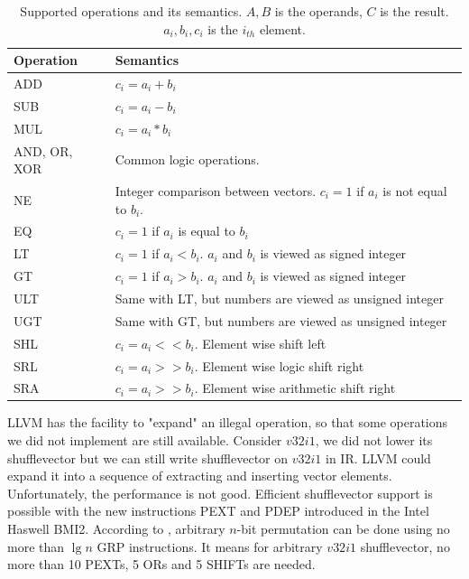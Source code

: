 \begin{table}
  \begin{center}
    \begin{tabular}{|l|l|}
      \hline
      Operation & Semantics \\ \hline
      ADD & $c_i = a_i + b_i$ \\\hline
      SUB & $c_i = a_i - b_i$ \\\hline
      MUL & $c_i = a_i * b_i$ \\\hline
      AND, OR, XOR & Common logic operations. \\\hline
      NE        & Integer comparison between vectors. $c_i = 1$ if $a_i$ is not equal to $b_i$.    \\ \hline
      EQ        & $c_i = 1$ if $a_i$ is equal to $b_i$                                  \\ \hline
      LT        & $c_i = 1$ if $a_i < b_i$. $a_i$ and $b_i$ is viewed as signed integer \\ \hline
      GT        & $c_i = 1$ if $a_i > b_i$. $a_i$ and $b_i$ is viewed as signed integer \\ \hline
      ULT       & Same with LT, but numbers are viewed as unsigned integer              \\ \hline
      UGT       & Same with GT, but numbers are viewed as unsigned integer              \\ \hline
      SHL       & $c_i = a_i << b_i$. Element wise shift left                            \\ \hline
      SRL       & $c_i = a_i >> b_i$. Element wise logic shift right                     \\ \hline
      SRA       & $c_i = a_i >> b_i$. Element wise arithmetic shift right                \\ \hline
    \end{tabular}
  \end{center}
  \caption[Supported operations and its semantics.]{Supported operations and its semantics. $A, B$ is the operands, $C$ is the result. $a_i, b_i, c_i$ is the $i_{th}$ element.}
  \label{table:semantics}
\end{table}

LLVM has the facility to "expand" an illegal operation, so that some operations we did not implement are still available. Consider $v32i1$, we did not lower its shufflevector but we can still write shufflevector on $v32i1$ in IR\@. LLVM could expand it into a sequence of extracting and inserting vector elements. Unfortunately, the performance is not good. Efficient shufflevector support is possible with the new instructions PEXT and PDEP introduced in the Intel Haswell BMI2. According to \cite{lee2001efficient}, arbitrary $n$-bit permutation can be done using no more than $\lg n$ GRP instructions. It means for arbitrary $v32i1$ shufflevector, no more than 10 PEXTs, 5 ORs and 5 SHIFTs are needed.

